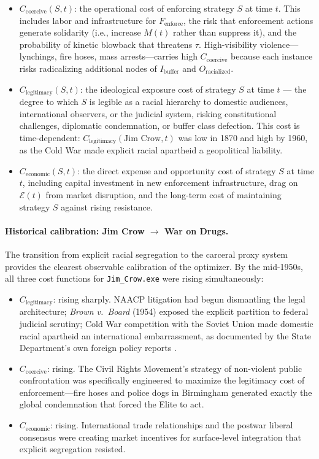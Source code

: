 \documentclass[12pt,openany]{book}
\begin{document}
\begin{itemize}[leftmargin=*]
    \item $C_{\text{coercive}}(S,t)$: the operational cost of enforcing strategy $S$ at time $t$. This includes labor and infrastructure for $F_{\text{enforce}}$, the risk that enforcement actions generate solidarity (i.e., increase $M(t)$ rather than suppress it), and the probability of kinetic blowback that threatens $\tau$. High-visibility violence---lynchings, fire hoses, mass arrests---carries high $C_{\text{coercive}}$ because each instance risks radicalizing additional nodes of $I_{\text{buffer}}$ and $O_{\text{racialized}}$.

    \item $C_{\text{legitimacy}}(S,t)$: the ideological exposure cost of strategy $S$ at time $t$ --- the degree to which $S$ is legible as a racial hierarchy to domestic audiences, international observers, or the judicial system, risking constitutional challenges, diplomatic condemnation, or buffer class defection. This cost is time-dependent: $C_{\text{legitimacy}}(\text{Jim Crow}, t)$ was low in 1870 and high by 1960, as the Cold War made explicit racial apartheid a geopolitical liability.

    \item $C_{\text{economic}}(S,t)$: the direct expense and opportunity cost of strategy $S$ at time $t$, including capital investment in new enforcement infrastructure, drag on $\mathcal{E}(t)$ from market disruption, and the long-term cost of maintaining strategy $S$ against rising resistance.
\end{itemize}

\paragraph{Historical calibration: Jim Crow $\to$ War on Drugs.}
The transition from explicit racial segregation to the carceral proxy system provides the clearest observable calibration of the optimizer. By the mid-1950s, all three cost functions for \texttt{Jim\_Crow.exe} were rising simultaneously:

\begin{itemize}[leftmargin=*]
    \item $C_{\text{legitimacy}}$: rising sharply. NAACP litigation had begun dismantling the legal architecture; \textit{Brown v.\ Board} (1954) exposed the explicit partition to federal judicial scrutiny; Cold War competition with the Soviet Union made domestic racial apartheid an international embarrassment, as documented by the State Department's own foreign policy reports \cite{dudziak}.
    \item $C_{\text{coercive}}$: rising. The Civil Rights Movement's strategy of non-violent public confrontation was specifically engineered to maximize the legitimacy cost of enforcement---fire hoses and police dogs in Birmingham generated exactly the global condemnation that forced the Elite to act.
    \item $C_{\text{economic}}$: rising. International trade relationships and the postwar liberal consensus were creating market incentives for surface-level integration that explicit segregation resisted.
\end{itemize}
\end{document}
